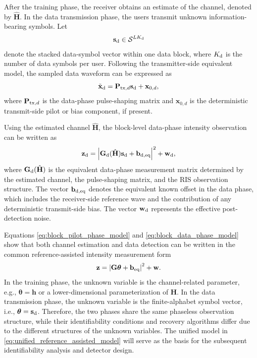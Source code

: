 \documentclass[journal]{IEEEtran}
\begin{document}
After the training phase, the receiver obtains an estimate of the channel, denoted by $\hat{\mathbf{H}}$. 
In the data transmission phase, the users transmit unknown information-bearing symbols. 
Let
\begin{equation}
\mathbf{s}_{\rm d}\in\mathcal{S}^{LK_{\rm d}}
\end{equation}
denote the stacked data-symbol vector within one data block, where $K_{\rm d}$ is the number of data symbols per user. 
Following the transmitter-side equivalent model, the sampled data waveform can be expressed as
\begin{equation}
\tilde{\mathbf{x}}_{\rm d}
=
\mathbf{P}_{{\rm tx},d}\mathbf{s}_{\rm d}
+
\mathbf{x}_{0,d},
\label{eq:data_transmit_block}
\end{equation}
where $\mathbf{P}_{{\rm tx},d}$ is the data-phase pulse-shaping matrix and $\mathbf{x}_{0,d}$ is the deterministic transmit-side pilot or bias component, if present.

Using the estimated channel $\hat{\mathbf{H}}$, the block-level data-phase intensity observation can be written as
\begin{equation}
\mathbf{z}_{\rm d}
=
\left|
\mathbf{G}_{\rm d}(\hat{\mathbf{H}})\mathbf{s}_{\rm d}
+
\mathbf{b}_{{\rm d},\rm eq}
\right|^2
+
\mathbf{w}_{\rm d},
\label{eq:block_data_phase_model}
\end{equation}
where $\mathbf{G}_{\rm d}(\hat{\mathbf{H}})$ is the equivalent data-phase measurement matrix determined by the estimated channel, the pulse-shaping matrix, and the RIS observation structure. 
The vector $\mathbf{b}_{{\rm d},\rm eq}$ denotes the equivalent known offset in the data phase, which includes the receiver-side reference wave and the contribution of any deterministic transmit-side bias. 
The vector $\mathbf{w}_{\rm d}$ represents the effective post-detection noise.

Equations \eqref{eq:block_pilot_phase_model} and \eqref{eq:block_data_phase_model} show that both channel estimation and data detection can be written in the common reference-assisted intensity measurement form
\begin{equation}
\mathbf{z}
=
\left|
\mathbf{G}\boldsymbol{\theta}
+
\mathbf{b}_{\rm eq}
\right|^2
+
\mathbf{w}.
\label{eq:unified_reference_assisted_model}
\end{equation}
In the training phase, the unknown variable is the channel-related parameter, e.g., $\boldsymbol{\theta}=\mathbf{h}$ or a lower-dimensional parameterization of $\mathbf{H}$. 
In the data transmission phase, the unknown variable is the finite-alphabet symbol vector, i.e., $\boldsymbol{\theta}=\mathbf{s}_{\rm d}$. 
Therefore, the two phases share the same phaseless observation structure, while their identifiability conditions and recovery algorithms differ due to the different structures of the unknown variables. 
The unified model in \eqref{eq:unified_reference_assisted_model} will serve as the basis for the subsequent identifiability analysis and detector design.
\end{document}
